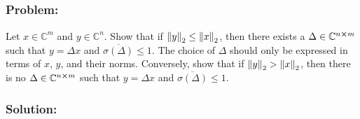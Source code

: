 \documentclass[letter]{article}
\numberwithin{equation}{section}
\newcommand{\C}{\mathbb{C}}
\begin{document}
\subsection{}
\subsubsection*{Problem:}
Let $x\in \C^m$ and $y \in \C^n$.
Show that if $\norm{y}_2 \leq \norm{x}_2$, then there exists a $\Delta \in \C^{n\cross m}$ such that $y = \Delta x$ and $\overline{\sigma(\Delta)}\leq 1$.
The choice of $\Delta$ should only be expressed in terms of $x$, $y$, and their norms.
Conversely, show that if $\norm{y}_2 > \norm{x}_2$, then there is no $\Delta \in \C^{n\cross m}$ such that $y = \Delta x$ and $\overline{\sigma(\Delta)}\leq 1$.

\subsubsection*{Solution:}
\end{document}

